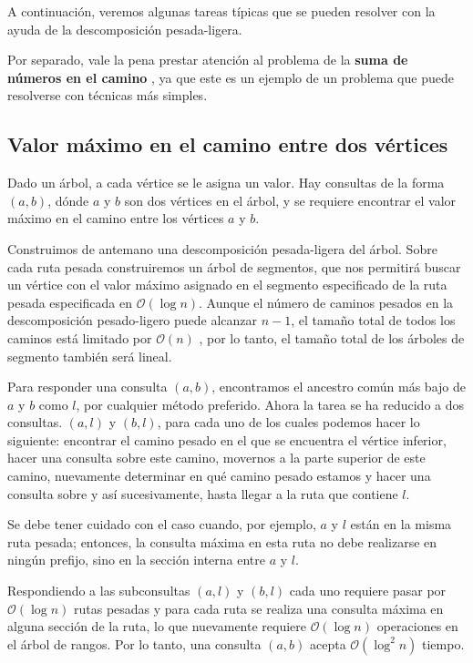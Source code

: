 A continuación, veremos algunas tareas típicas que se pueden resolver con la ayuda de la descomposición pesada-ligera.

Por separado, vale la pena prestar atención al problema de la \textbf{suma de números en el camino} , ya que este es un ejemplo de un problema que puede resolverse con técnicas más simples.

\subsection{Valor máximo en el camino entre dos vértices}

Dado un árbol, a cada vértice se le asigna un valor. Hay consultas de la forma $(a,b)$, dónde $a$ y $b$ son dos vértices en el árbol, y se requiere encontrar el valor máximo en el camino entre los vértices $a$ y $b$.

Construimos de antemano una descomposición pesada-ligera del árbol. Sobre cada ruta pesada construiremos un árbol de segmentos, que nos permitirá buscar un vértice con el valor máximo asignado en el segmento especificado de la ruta pesada especificada en $\mathcal{O}(\log n)$. Aunque el número de caminos pesados en la descomposición pesado-ligero puede alcanzar $n-1$, el tamaño total de todos los caminos está limitado por $\mathcal{O}(n)$ , por lo tanto, el tamaño total de los árboles de segmento también será lineal.

Para responder una consulta $(a,b)$, encontramos el ancestro común más bajo de $a$ y $b$ como $l$, por cualquier método preferido. Ahora la tarea se ha reducido a dos consultas. $(a,l)$ y $(b,l)$, para cada uno de los cuales podemos hacer lo siguiente: encontrar el camino pesado en el que se encuentra el vértice inferior, hacer una consulta sobre este camino, movernos a la parte superior de este camino, nuevamente determinar en qué camino pesado estamos y hacer una consulta sobre y así sucesivamente, hasta llegar a la ruta que contiene $l$.

Se debe tener cuidado con el caso cuando, por ejemplo, $a$ y $l$ están en la misma ruta pesada; entonces, la consulta máxima en esta ruta no debe realizarse en ningún prefijo, sino en la sección interna entre $a$ y $l$.

Respondiendo a las subconsultas $(a,l)$ y $(b,l)$ cada uno requiere pasar por $\mathcal{O}(\log n)$ 
rutas pesadas y para cada ruta se realiza una consulta máxima en alguna sección de la ruta, lo que 
nuevamente requiere $\mathcal{O}(\log n)$ operaciones en el árbol de rangos. Por lo tanto, una consulta 
$(a,b)$ acepta $\mathcal{O}(\log^2 n)$ tiempo.

